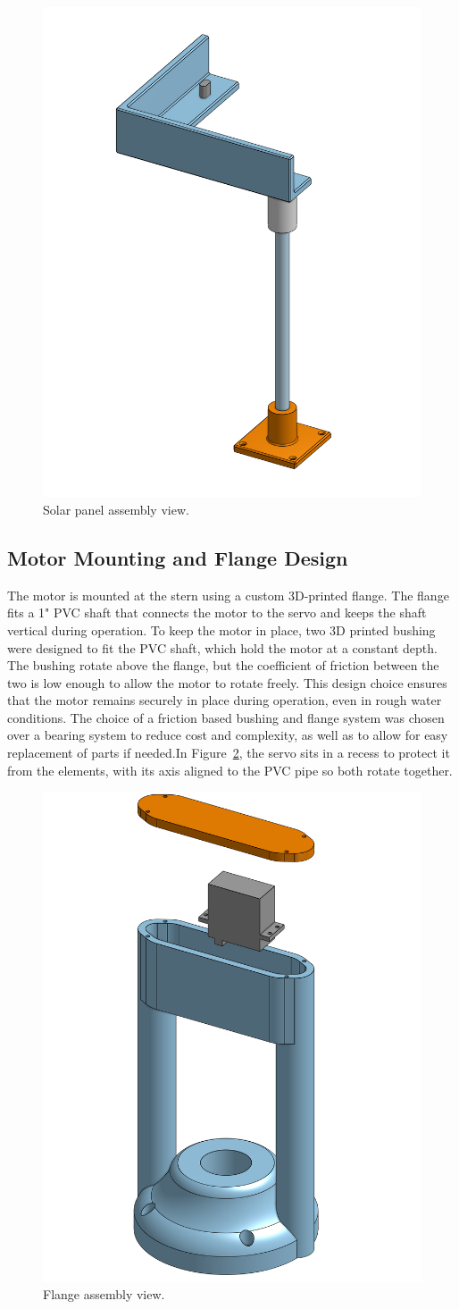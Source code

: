 \begin{figure}[htbp]
  \centering
  \includegraphics[width=0.4\linewidth]{"Solar_Panel_Assembly.png"}
  \caption{Solar panel assembly view.}
  \label{fig:solar-panel}
\end{figure}

\subsection{Motor Mounting and Flange Design}
The motor is mounted at the stern using a custom 3D-printed flange. The flange fits a 1" PVC shaft that connects the motor to the servo and keeps the shaft vertical during operation. To keep the motor in place, two 3D printed bushing were designed to fit the PVC shaft, which hold the motor at a constant depth. The bushing rotate above the flange, but the coefficient of friction between the two is low enough to allow the motor to rotate freely. This design choice ensures that the motor remains securely in place during operation, even in rough water conditions. The choice of a friction based bushing and flange system was chosen over a bearing system to reduce cost and complexity, as well as to allow for easy replacement of parts if needed.In Figure~\ref{fig:flange}, the servo sits in a recess to protect it from the elements, with its axis aligned to the PVC pipe so both rotate together.

\begin{figure}[htbp]
  \centering
  \includegraphics[width=0.4\linewidth]{"Flange_Assembly.png"}
  \caption{Flange assembly view.}
  \label{fig:flange}
\end{figure}

